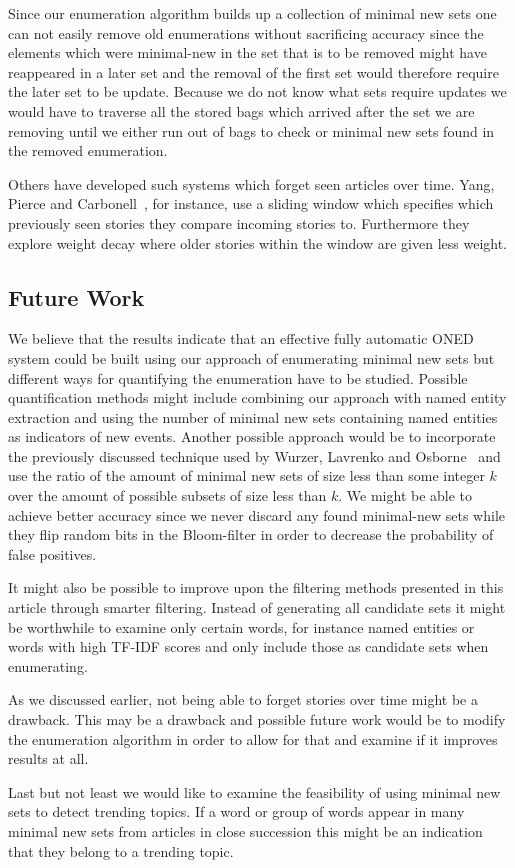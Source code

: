 Since our enumeration algorithm builds up a collection of minimal new sets one can not easily remove old enumerations without sacrificing accuracy since the elements which were minimal-new in the set that is to be removed might have reappeared in a later set and the removal of the first set would therefore require the later set to be update. Because we do not know what sets require updates we would have to traverse all the stored bags which arrived after the set we are removing until we either run out of bags to check or minimal new sets found in the removed enumeration.

Others have developed such systems which forget seen articles over time. Yang, Pierce and Carbonell~\cite{yang1998study}, for instance, use a sliding window which specifies which previously seen stories they compare incoming stories to. Furthermore they explore weight decay where older stories within the window are given less weight.

\subsection{Future Work}
We believe that the results indicate that an effective fully automatic ONED system could be built using our approach of enumerating minimal new sets but different ways for quantifying the enumeration have to be studied. Possible quantification methods might include combining our approach with named entity extraction and using the number of minimal new sets containing named entities as indicators of new events. Another possible approach would be to incorporate the previously discussed technique used by Wurzer, Lavrenko and Osborne~\cite{wurzer2015kterm} and use the ratio of the amount of minimal new sets of size less than some integer $k$ over the amount of possible subsets of size less than $k$. We might be able to achieve better accuracy since we never discard any found minimal-new sets while they flip random bits in the Bloom-filter in order to decrease the probability of false positives.

It might also be possible to improve upon the filtering methods presented in this article through smarter filtering. Instead of generating all candidate sets it might be worthwhile to examine only certain words, for instance named entities or words with high TF-IDF scores and only include those as candidate sets when enumerating.

As we discussed earlier, not being able to forget stories over time might be a drawback. This may be a drawback and possible future work would be to modify the enumeration algorithm in order to allow for that and examine if it improves results at all.

Last but not least we would like to examine the feasibility of using minimal new sets to detect trending topics. If a word or group of words appear in many minimal new sets from articles in close succession this might be an indication that they belong to a trending topic.
